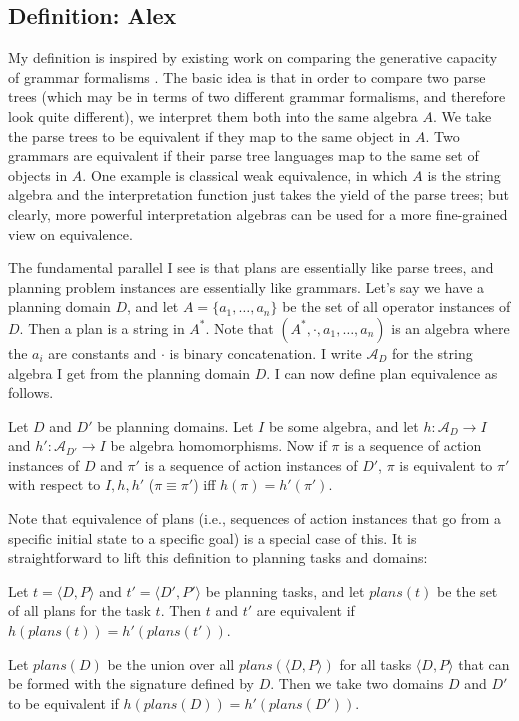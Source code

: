 \subsection{Definition: Alex}
\label{definition-alex}

My definition is inspired by existing work on comparing the generative
capacity of grammar formalisms \cite{miller99:_stron}.  The basic idea
is that in order to compare two parse trees (which may be in terms of
two different grammar formalisms, and therefore look quite different),
we interpret them both into the same algebra $A$.  We take the parse
trees to be equivalent if they map to the same object in $A$.  Two
grammars are equivalent if their parse tree languages map to the same
set of objects in $A$.  One example is classical weak equivalence, in
which $A$ is the string algebra and the interpretation function just
takes the yield of the parse trees; but clearly, more powerful
interpretation algebras can be used for a more fine-grained view on
equivalence.

\newcommand{\A}{{\mathcal A}}

The fundamental parallel I see is that plans are essentially like
parse trees, and planning problem instances are essentially like
grammars.  Let's say we have a planning domain $D$, and let $A =
\{a_1,\ldots,a_n\}$ be the set of all operator instances of $D$.  Then
a plan is a string in $A^*$. Note that $(A^*,\cdot,a_1,\ldots,a_n)$ is
an algebra where the $a_i$ are constants and $\cdot$ is binary
concatenation.  I write $\A_D$ for the string algebra I get from the
planning domain $D$.  I can now define plan equivalence as follows.

\begin{definition}
  Let $D$ and $D'$ be planning domains.  Let $I$ be some algebra, and
  let $h:\A_D \rightarrow I$ and $h':\A_{D'} \rightarrow I$ be algebra
  homomorphisms. Now if $\pi$ is a sequence of action instances of $D$
  and $\pi'$ is a sequence of action instances of $D'$, $\pi$ is
  equivalent to $\pi'$ with respect to $I,h,h'$ ($\pi \equiv \pi'$)
  iff $h(\pi) = h'(\pi')$.
\end{definition}

Note that equivalence of plans (i.e., sequences of action instances
that go from a specific initial state to a specific goal) is a special
case of this. It is straightforward to lift this definition to
planning tasks and domains:

\begin{definition}
  Let $t = \langle D,P \rangle$ and $t' = \langle D',P'\rangle$ be
  planning tasks, and let $plans(t)$ be the set of all plans for the task
  $t$. Then $t$ and $t'$ are equivalent if $h(plans(t)) =
  h'(plans(t'))$.

  Let $plans(D)$ be the union over all $plans(\langle D,P \rangle)$
  for all tasks $\langle D,P \rangle$ that can be formed with the
  signature defined by $D$.  Then we take two domains $D$ and $D'$ to
  be equivalent if $h(plans(D)) = h'(plans(D'))$.
\end{definition}

